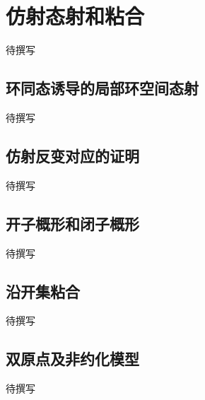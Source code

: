 
% 
% 

\section{仿射态射和粘合}
\label{g5:sec:1003}

待撰写

\subsection{环同态诱导的局部环空间态射}
\label{g5:subsec:1003:01}
待撰写

\subsection{仿射反变对应的证明}
\label{g5:subsec:1003:02}
待撰写

\subsection{开子概形和闭子概形}
\label{g5:subsec:1003:03}
待撰写

\subsection{沿开集粘合}
\label{g5:subsec:1003:04}
待撰写

\subsection{双原点及非约化模型}
\label{g5:subsec:1003:05}
待撰写
